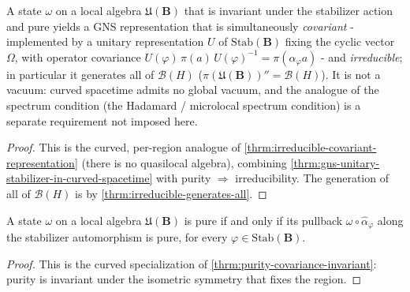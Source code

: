 \begin{theorem}
    \label{thrm:irreducible-covariant-representation-in-curved-spacetime}
    \leanok
    A state $\omega$ on a local algebra $\mathfrak{U}(\mathbf{B})$ that is invariant under the stabilizer action and pure yields a GNS representation that is simultaneously \emph{covariant} - implemented by a unitary representation $U$ of $\mathrm{Stab}(\mathbf{B})$ fixing the cyclic vector $\Omega$, with operator covariance $U(\varphi)\,\pi(a)\,U(\varphi)^{-1} = \pi(\hat\alpha_\varphi a)$ - and \emph{irreducible}; in particular it generates all of $\mathcal{B}(H)$ ($\pi(\mathfrak{U}(\mathbf{B}))'' = \mathcal{B}(H)$). It is not a vacuum: curved spacetime admits no global vacuum, and the analogue of the spectrum condition (the Hadamard / microlocal spectrum condition) is a separate requirement not imposed here.
\end{theorem}
\begin{proof}
    \leanok
    This is the curved, per-region analogue of \ref{thrm:irreducible-covariant-representation} (there is no quasilocal algebra), combining \ref{thrm:gns-unitary-stabilizer-in-curved-spacetime} with purity $\Rightarrow$ irreducibility. The generation of all of $\mathcal{B}(H)$ is by \ref{thrm:irreducible-generates-all}.
\end{proof}

\begin{theorem}
    \label{thrm:purity-covariance-invariant-in-curved-spacetime}
    \leanok
    A state $\omega$ on a local algebra $\mathfrak{U}(\mathbf{B})$ is pure if and only if its pullback $\omega \circ \hat\alpha_\varphi$ along the stabilizer automorphism is pure, for every $\varphi \in \mathrm{Stab}(\mathbf{B})$.
\end{theorem}
\begin{proof}
    \leanok
    This is the curved specialization of \ref{thrm:purity-covariance-invariant}: purity is invariant under the isometric symmetry that fixes the region.
\end{proof}

